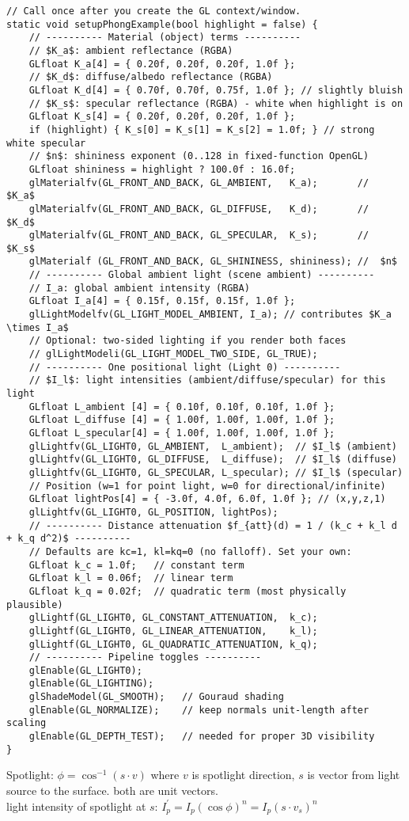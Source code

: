 \documentclass[10pt,twocolumn]{extarticle}
\begin{document}
\begin{lstlisting}[mathescape=true]
// Call once after you create the GL context/window.
static void setupPhongExample(bool highlight = false) {
    // ---------- Material (object) terms ----------
    // $K_a$: ambient reflectance (RGBA)
    GLfloat K_a[4] = { 0.20f, 0.20f, 0.20f, 1.0f };
    // $K_d$: diffuse/albedo reflectance (RGBA)
    GLfloat K_d[4] = { 0.70f, 0.70f, 0.75f, 1.0f }; // slightly bluish
    // $K_s$: specular reflectance (RGBA) - white when highlight is on
    GLfloat K_s[4] = { 0.20f, 0.20f, 0.20f, 1.0f };
    if (highlight) { K_s[0] = K_s[1] = K_s[2] = 1.0f; } // strong white specular
    // $n$: shininess exponent (0..128 in fixed-function OpenGL)
    GLfloat shininess = highlight ? 100.0f : 16.0f;
    glMaterialfv(GL_FRONT_AND_BACK, GL_AMBIENT,   K_a);       //  $K_a$
    glMaterialfv(GL_FRONT_AND_BACK, GL_DIFFUSE,   K_d);       //  $K_d$
    glMaterialfv(GL_FRONT_AND_BACK, GL_SPECULAR,  K_s);       //  $K_s$
    glMaterialf (GL_FRONT_AND_BACK, GL_SHININESS, shininess); //  $n$
    // ---------- Global ambient light (scene ambient) ----------
    // I_a: global ambient intensity (RGBA)
    GLfloat I_a[4] = { 0.15f, 0.15f, 0.15f, 1.0f };
    glLightModelfv(GL_LIGHT_MODEL_AMBIENT, I_a); // contributes $K_a \times I_a$
    // Optional: two-sided lighting if you render both faces
    // glLightModeli(GL_LIGHT_MODEL_TWO_SIDE, GL_TRUE);
    // ---------- One positional light (Light 0) ----------
    // $I_l$: light intensities (ambient/diffuse/specular) for this light
    GLfloat L_ambient [4] = { 0.10f, 0.10f, 0.10f, 1.0f };
    GLfloat L_diffuse [4] = { 1.00f, 1.00f, 1.00f, 1.0f };
    GLfloat L_specular[4] = { 1.00f, 1.00f, 1.00f, 1.0f };
    glLightfv(GL_LIGHT0, GL_AMBIENT,  L_ambient);  // $I_l$ (ambient)
    glLightfv(GL_LIGHT0, GL_DIFFUSE,  L_diffuse);  // $I_l$ (diffuse)
    glLightfv(GL_LIGHT0, GL_SPECULAR, L_specular); // $I_l$ (specular)
    // Position (w=1 for point light, w=0 for directional/infinite)
    GLfloat lightPos[4] = { -3.0f, 4.0f, 6.0f, 1.0f }; // (x,y,z,1)
    glLightfv(GL_LIGHT0, GL_POSITION, lightPos);
    // ---------- Distance attenuation $f_{att}(d) = 1 / (k_c + k_l d + k_q d^2)$ ----------
    // Defaults are kc=1, kl=kq=0 (no falloff). Set your own:
    GLfloat k_c = 1.0f;   // constant term
    GLfloat k_l = 0.06f;  // linear term
    GLfloat k_q = 0.02f;  // quadratic term (most physically plausible)
    glLightf(GL_LIGHT0, GL_CONSTANT_ATTENUATION,  k_c);
    glLightf(GL_LIGHT0, GL_LINEAR_ATTENUATION,    k_l);
    glLightf(GL_LIGHT0, GL_QUADRATIC_ATTENUATION, k_q);
    // ---------- Pipeline toggles ----------
    glEnable(GL_LIGHT0);
    glEnable(GL_LIGHTING);
    glShadeModel(GL_SMOOTH);   // Gouraud shading
    glEnable(GL_NORMALIZE);    // keep normals unit-length after scaling
    glEnable(GL_DEPTH_TEST);   // needed for proper 3D visibility
}  
\end{lstlisting}
Spotlight: $\phi = \cos^{-1}(s \cdot v)$ where $v$ is spotlight direction, $s$ is vector from light source to the surface. both are unit vectors.\\
light intensity of spotlight at $s$: $I_p^{'} = I_p(\cos \phi)^n = I_p(s\cdot v_s)^n$
\end{document}
